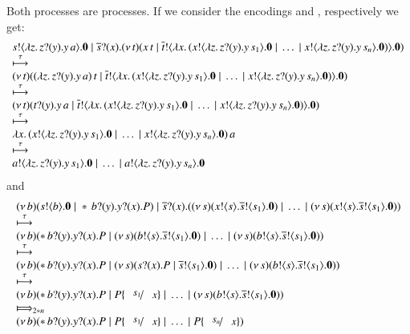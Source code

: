 Both processes are \HOp processes.
If we consider the encodings \HO and \sessp, respectively
we get:
\[
\begin{array}{l}
	s ! \langle \lambda z.\,z ? (y) . y\, {a} \rangle . \mathbf{0} \;|\; \overline{s} ? (x) . (\nu\, t)(x\, {t} \;|\; \overline{t} ! \langle \lambda x.\,(x ! \langle \lambda z.\,z ? (y) . y\, {s_1} \rangle . \mathbf{0} \;|\; \dots \;|\; x ! \langle \lambda z.\,z ? (y) . y\, {s_n} \rangle . \mathbf{0}) \rangle . \mathbf{0})\\
	\stackrel{\tau}{\longmapsto}\\
	(\nu\, t)((\lambda z.\,z ? (y) . y\, {a})\, {t} \;|\; \overline{t} ! \langle \lambda x.\,(x ! \langle \lambda z.\,z ? (y) . y\, {s_1} \rangle . \mathbf{0} \;|\; \dots \;|\; x ! \langle \lambda z.\,z ? (y) . y\, {s_n} \rangle . \mathbf{0}) \rangle . \mathbf{0})\\
	\stackrel{\tau}{\longmapsto}\\
	(\nu\, t)(t ? (y) . y\, {a} \;|\; \overline{t} ! \langle \lambda x.\,(x ! \langle \lambda z.\,z ? (y) . y\, {s_1} \rangle . \mathbf{0} \;|\; \dots \;|\; x ! \langle \lambda z.\,z ? (y) . y\, {s_n} \rangle . \mathbf{0}) \rangle . \mathbf{0})\\
	\stackrel{\tau}{\longmapsto}\\
	\lambda x.\,(x ! \langle \lambda z.\,z ? (y) . y\, {s_1} \rangle . \mathbf{0} \;|\; \dots \;|\; x ! \langle \lambda z.\,z ? (y) . y\, {s_n} \rangle . \mathbf{0})\, {a}
	\\
	\stackrel{\tau}{\longmapsto}
	\\
	a ! \langle \lambda z.\,z ? (y) . y\, {s_1} \rangle . \mathbf{0} \;|\; \dots \;|\; a ! \langle \lambda z.\,z ? (y) . y\, {s_n} \rangle . \mathbf{0}
\end{array}
\]
and 
\[
\begin{array}{l}
	\newsp{b}{\bout{s}{b} \inact \Par \repl \binp{b}{y} \binp{y}{x} P} \Par \binp{\dual{s}}{x} (\newsp{s}{\bout{x}{s} \bout{\dual{s}}{s_1} \inact} \Par \dots \Par \newsp{s}{\bout{x}{s} \bout{\dual{s}}{s_1}\inact})
	\\
	\hby{\tau}
	\\
	\newsp{b}{\repl \binp{b}{y} \binp{y}{x} P \Par \newsp{s}{\bout{b}{s} \bout{\dual{s}}{s_1} \inact} \Par \dots \Par \newsp{s}{\bout{b}{s} \bout{\dual{s}}{s_1} \inact}}
	\\
	\hby{\tau}
	\\
	\newsp{b}{\repl \binp{b}{y} \binp{y}{x} P \Par \newsp{s}{\binp{s}{x} P \Par \bout{\dual{s}}{s_1} \inact} \Par \dots \Par \newsp{s}{\bout{b}{s} \bout{\dual{s}}{s_1} \inact}}
	\\
	\hby{\tau}
	\\
	\newsp{b}{\repl \binp{b}{y} \binp{y}{x} P \Par P\subst{s_1}{x} \Par \dots \Par \newsp{s}{\bout{b}{s} \bout{\dual{s}}{s_1} \inact}}
	\\
	\Hby{}_{2*n}
	\\
	\newsp{b}{\repl \binp{b}{y} \binp{y}{x} P \Par P\subst{s_1}{x} \Par \dots \Par P\subst{s_n}{x}}
	
\end{array}
\]

